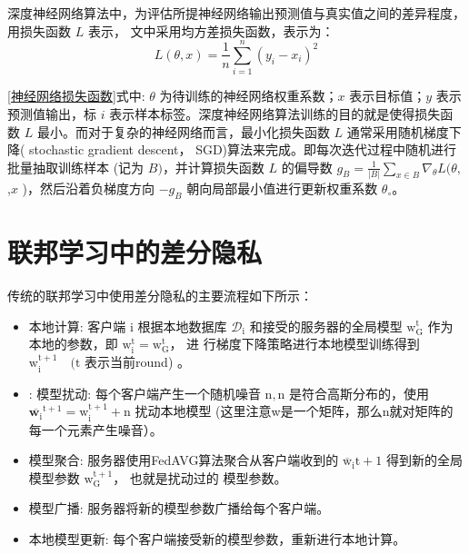 深度神经网络算法中，为评估所提神经网络输出预测值与真实值之间的差异程度，用损失函数 $L$ 表示， 文中采用均方差损失函数，表示为：
\begin{equation}\label{神经网络损失函数}
L(\theta,x)=\frac{1}{n} \sum_{i=1}^{n}\left(y_{i}-x_{i}\right)^{2}
\end{equation}

\ref{神经网络损失函数}式中: $\theta$ 为待训练的神经网络权重系数；$x$ 表示目标值；$y$ 表示预测值输出，标 $i$ 表示样本标签。深度神经网络算法训练的目的就是使得损失函数 $L$ 最小。而对于复杂的神经网络而言，最小化损失函数 $L$ 通常采用随机梯度下降( stochastic gradient descent， SGD)算法来完成。即每次迭代过程中随机进行批量抽取训练样本 (记为 $B)$，并计算损失函数 $L$ 的偏导数 $g_{B}=\frac{1}{|B|} \sum_{x \in B} \nabla_{\theta} L(\theta,$,$x$ )，然后沿着负梯度方向 $-g_{B}$ 朝向局部最小值进行更新权重系数 $\theta_{\circ}$。

\section{联邦学习中的差分隐私}
传统的联邦学习中使用差分隐私的主要流程如下所示：
\begin{itemize}
\item 本地计算:
客户端 $\mathrm{i}$ 根据本地数据库 $\mathcal{D}_{\mathrm{i}}$ 和接受的服务器的全局模型 $\mathrm{w}_{\mathrm{G}}^{\mathrm{t}}$ 作为本地的参数，即 $\mathrm{w}_{\mathrm{i}}^{\mathrm{t}}=\mathrm{w}_{\mathrm{G}}^{\mathrm{t}}$， 进 行梯度下降策略进行本地模型训练得到 $\mathrm{w}_{\mathrm{i}}^{\mathrm{t}+1} \quad(\mathrm{t}$ 表示当前round) 。

\item: 模型扰动:
每个客户端产生一个随机噪音 $\mathrm{n},\mathrm{n}$ 是符合高斯分布的，使用 $\overline{\mathbf{w}_{\mathrm{i}}}^{\mathrm{t}+1}=\mathrm{w}_{\mathrm{i}}^{\mathrm{t}+1}+\mathrm{n}$ 扰动本地模型 (这里注意w是一个矩阵，那么n就对矩阵的每一个元素产生噪音）。

\item 模型聚合:
服务器使用FedAVG算法聚合从客户端收到的 $\overline{\mathrm{w}}_{\mathrm{i}} \mathrm{t}+1$ 得到新的全局模型参数 $\mathrm{w}_{\mathrm{G}}^{\mathrm{t}+1}$， 也就是扰动过的 模型参数。

\item 模型广播:
服务器将新的模型参数广播给每个客户端。

\item 本地模型更新:
每个客户端接受新的模型参数，重新进行本地计算。
\end{itemize}

